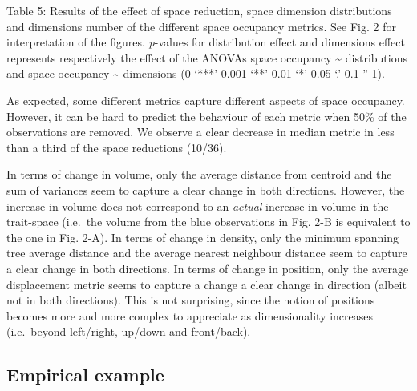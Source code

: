 \documentclass[]{article}
\begin{document}
Table 5: Results of the effect of space reduction, space dimension
distributions and dimensions number of the different space occupancy
metrics. See Fig. 2 for interpretation of the figures. \emph{p}-values
for distribution effect and dimensions effect represents respectively
the effect of the ANOVAs space occupancy \textasciitilde{} distributions
and space occupancy \textasciitilde{} dimensions (0 `***' 0.001 `**'
0.01 `*' 0.05 `.' 0.1 '' 1).

As expected, some different metrics capture different aspects of space
occupancy. However, it can be hard to predict the behaviour of each
metric when 50\% of the observations are removed. We observe a clear
decrease in median metric in less than a third of the space reductions
(10/36).

In terms of change in volume, only the average distance from centroid
and the sum of variances seem to capture a clear change in both
directions. However, the increase in volume does not correspond to an
\emph{actual} increase in volume in the trait-space (i.e.~the volume
from the blue observations in Fig. 2-B is equivalent to the one in Fig.
2-A). In terms of change in density, only the minimum spanning tree
average distance and the average nearest neighbour distance seem to
capture a clear change in both directions. In terms of change in
position, only the average displacement metric seems to capture a change
a clear change in direction (albeit not in both directions). This is not
surprising, since the notion of positions becomes more and more complex
to appreciate as dimensionality increases (i.e.~beyond left/right,
up/down and front/back).

\subsection{Empirical example}\label{empirical-example}
\end{document}
